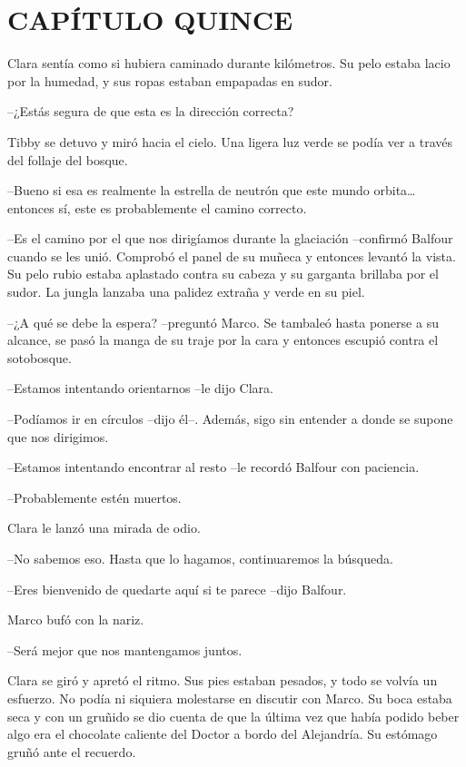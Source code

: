 \chapter*{CAPÍTULO QUINCE}

{Clara sentía como si hubiera caminado durante kilómetros. Su pelo estaba
lacio por la humedad, y sus ropas estaban empapadas en sudor.}

{--¿Estás segura de que esta es la dirección correcta?}

{Tibby se detuvo y miró hacia el cielo. Una ligera luz verde se podía ver
a través del follaje del bosque.}

{--Bueno si esa es realmente la estrella de neutrón que este mundo
 orbita\ldots{} entonces sí, este es probablemente el camino correcto.}

{--Es el camino por el que nos dirigíamos durante la glaciación
 --confirmó Balfour cuando se les unió. Comprobó el panel de su muñeca y
 entonces levantó la vista. Su pelo rubio estaba aplastado contra su
 cabeza y su garganta brillaba por el sudor. La jungla lanzaba una
palidez extraña y verde en su piel.}

{--¿A qué se debe la espera? --preguntó Marco. Se tambaleó hasta ponerse
 a su alcance, se pasó la manga de su traje por la cara y entonces
escupió contra el sotobosque.}

{--Estamos intentando orientarnos --le dijo Clara.}

{--Podíamos ir en círculos --dijo él--. Además, sigo sin entender a donde
se supone que nos dirigimos.}

{--Estamos intentando encontrar al resto --le recordó Balfour con
paciencia.}

{--Probablemente estén muertos.}

{Clara le lanzó una mirada de odio.}

{--No sabemos eso. Hasta que lo hagamos, continuaremos la búsqueda.}

{--Eres bienvenido de quedarte aquí si te parece --dijo Balfour.}

{Marco bufó con la nariz.}

{--Será mejor que nos mantengamos juntos.}

{Clara se giró y apretó el ritmo. Sus pies estaban pesados, y todo se
 volvía un esfuerzo. No podía ni siquiera molestarse en discutir con
 Marco. Su boca estaba seca y con un gruñido se dio cuenta de que la
 última vez que había podido beber algo era el chocolate caliente del
Doctor a bordo del Alejandría. Su estómago gruñó ante el recuerdo.}

